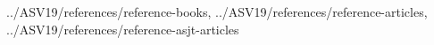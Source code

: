 \nocite
{
    BGR14,
    ACV15,
    Jia12,
    TR98,
    RC08,
    AT18,
    Car10,
    Her04,
    LOT83
}



{
    ../ASV19/references/reference-books,
    ../ASV19/references/reference-articles,
    ../ASV19/references/reference-asjt-articles
}